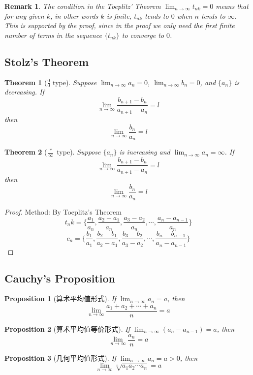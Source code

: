\documentclass[onecolumn]{ctexart}
\newtheorem{theorem}{Theorem}
\newtheorem{proposition}{Proposition}
\newtheorem{remark}{Remark}
\begin{document}
\begin{remark}
  The condition in the Toeplitz' Theorem $\lim_{n \to \infty} t_{nk} = 0$ means 
  that for any given $k$, in other words $k$ is finite, $t_{nk}$ tends to $0$ 
  when $n$ tends to $\infty$. This is supported by the proof, since in the proof 
  we only need the first finite number of terms in the sequence $\{t_{nk}\}$ to 
  converge to $0$.
\end{remark}

\subsection{Stolz's Theorem}

\begin{theorem}[$\frac{0}{0}$ type]
  Suppose $\lim_{n \to \infty} a_n = 0$, $\lim_{n \to \infty} b_n = 0$, and 
  $\{a_n\}$ is decreasing. If 
  \[
    \lim_{n \to \infty} \frac{b_{n+1} - b_n}{a_{n+1} - a_n} = l
  \]
  then 
  \[
    \lim_{n \to \infty} \frac{b_n}{a_n} = l
  \]
\end{theorem}

\begin{theorem}[$\frac{*}{\infty}$ type]
  Suppose $\{a_n\}$ is increasing and $\lim_{n \to \infty} a_n = \infty$. If
  \[
    \lim_{n \to \infty} \frac{b_{n+1} - b_n}{a_{n+1} - a_n} = l
  \]
  then
  \[
    \lim_{n \to \infty} \frac{b_n}{a_n} = l   
  \]
\end{theorem}

\begin{proof}
  Method: By Toeplitz's Theorem
  \[
    t_nk = \{\frac{a_1}{a_n}, \frac{a_2 - a_1}{a_n}, \frac{a_3 - a_2}{a_n}, \cdots, \frac{a_n - a_{n-1}}{a_n}\}
  \]
  \[
    c_n = \{\frac{b_1}{a_1}, \frac{b_2 - b_1}{a_2 - a_1}, \frac{b_3 - b_2}{a_3 - a_2}, \cdots, \frac{b_n - b_{n-1}}{a_n - a_{n-1}}\}
  \]
\end{proof}

\subsection{Cauchy's Proposition}

\begin{proposition}[算术平均值形式]
  If $\lim_{n \to \infty} a_n = a$, then
  \[
    \lim_{n \to \infty} \frac{a_1 + a_2 + \cdots + a_n}{n} = a
  \]
\end{proposition}

\begin{proposition}[算术平均值等价形式]
  If $\lim_{n \to \infty} (a_n - a_{n-1}) = a$, then
  \[
    \lim_{n \to \infty} \frac{a_n}{n} = a
  \]
\end{proposition}

\begin{proposition}[几何平均值形式]
  If $\lim_{n \to \infty} a_n = a > 0$, then
  \[
    \lim_{n \to \infty} \sqrt[n]{a_1 a_2 \cdots a_n} = a
  \]
\end{proposition}
\end{document}
